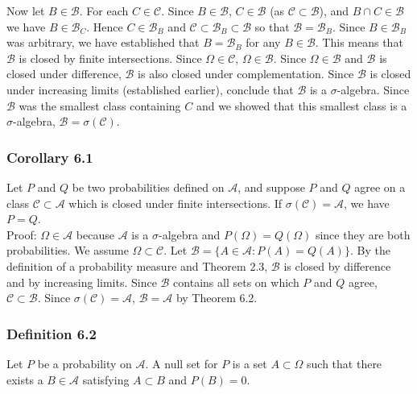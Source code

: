 \documentclass{article}
\begin{document}
{Now let $B \in \mathcal{B}$. For each $C \in \mathcal{C}$. Since $B \in \mathcal{B}$, $C \in \mathcal{B}$ (as $\mathcal{C} \subset \mathcal{B}$), and $B \cap C \in \mathcal{B}$  we have $B \in \mathcal{B}_C$. Hence $C \in \mathcal{B}_B$ and $\mathcal{C} \subset \mathcal{B}_B \subset \mathcal{B}$ so that $\mathcal{B} = \mathcal{B}_B$. Since $B \in \mathcal{B}_B$ was arbitrary, we have established that $B = \mathcal{B}_B$ for any $B \in \mathcal{B}$. This means that $\mathcal{B}$ is closed by finite intersections. Since $\Omega \in \mathcal{C}$, $\Omega \in \mathcal{B}$. Since $\Omega \in \mathcal{B}$ and $\mathcal{B}$ is closed under difference, $\mathcal{B}$ is also closed under complementation. Since $\mathcal{B}$ is closed under increasing limits (established earlier), conclude that $\mathcal{B}$ is a $\sigma$-algebra. Since $\mathcal{B}$ was the smallest class containing $C$ and we showed that this smallest class is a $\sigma$-algebra, $\mathcal{B} = \sigma(\mathcal{C})$. 

\subsubsection*{Corollary 6.1}

Let $P$ and $Q$ be two probabilities defined on $\mathcal{A}$, and suppose $P$ and $Q$ agree on a class $\mathcal{C} \subset \mathcal{A}$ which is closed under finite intersections. If $\sigma(\mathcal{C}) = \mathcal{A}$, we have $P = Q$. \\

Proof: $\Omega \in \mathcal{A}$ because $\mathcal{A}$ is a $\sigma$-algebra and $P(\Omega) = Q(\Omega)$ since they are both probabilities. We assume $\Omega \subset \mathcal{C}$. Let $\mathcal{B} = \{A \in \mathcal{A} : P(A) = Q(A)\}$. By the definition of a probability measure and Theorem 2.3, $\mathcal{B}$ is closed by difference and by increasing limits. Since $\mathcal{B}$ contains all sets on which $P$ and $Q$ agree, $\mathcal{C}\subset \mathcal{B}$. Since $\sigma(\mathcal{C}) = \mathcal{A}$, $\mathcal{B} = \mathcal{A}$ by Theorem 6.2.



\subsubsection*{Definition 6.2}

Let $P$ be a probability on $\mathcal{A}$. A null set for $P$ is a set $A \subset \Omega$ such that there exists a $B \in \mathcal{A}$ satisfying $A \subset B$ and $P(B) = 0$. 


}
\end{document}
